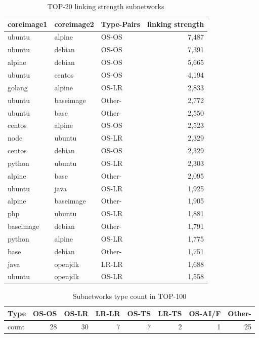\documentclass[sigconf]{acmart}
\begin{document}
\begin{table}[htbp]
  \centering
  \caption{TOP-20 linking strength subnetworks}
    \begin{tabular}{lllr}
	\toprule
    coreimage1 & coreimage2 & Type-Pairs & \multicolumn{1}{l}{linking strength} \\
	\midrule
    ubuntu & alpine & OS-OS & 7,487 \\
    ubuntu & debian & OS-OS & 7,391 \\
    alpine & debian & OS-OS & 5,665 \\
    ubuntu & centos & OS-OS & 4,194 \\
    golang & alpine & OS-LR & 2,833 \\
    ubuntu & baseimage & Other- & 2,772 \\
    ubuntu & base  & Other- & 2,550 \\
    centos & alpine & OS-OS & 2,523 \\
    node  & ubuntu & OS-LR & 2,329 \\
    centos & debian & OS-OS & 2,329 \\
    python & ubuntu & OS-LR & 2,303 \\
    alpine & base  & Other- & 2,095 \\
    ubuntu & java  & OS-LR & 1,925 \\
    alpine & baseimage & Other- & 1,905 \\
    php   & ubuntu & OS-LR & 1,881 \\
    baseimage & debian & Other- & 1,791 \\
    python & alpine & OS-LR & 1,775 \\
    base  & debian & Other- & 1,751 \\
    java  & openjdk & LR-LR & 1,688 \\
    ubuntu & openjdk & OS-LR & 1,558 \\
	\bottomrule
    \end{tabular}%
  \label{tab:addlabel}%
\end{table}%




\begin{table}[htbp]
  \centering
	\small
  \caption{Subnetworks type count in TOP-100}
    \begin{tabular}{lrrrrrrr}
\toprule
    Type & \multicolumn{1}{l}{OS-OS} & \multicolumn{1}{l}{OS-LR} & \multicolumn{1}{l}{LR-LR} & \multicolumn{1}{l}{OS-TS} & \multicolumn{1}{l}{LR-TS} & \multicolumn{1}{l}{OS-AI/F} & \multicolumn{1}{l}{Other-} \\
\midrule
    count & 28    & 30   & 7    & 7  & 2  & 1 & 25 \\
\bottomrule
    \end{tabular}%
  \label{tab:addlabel}%
\end{table}%
\end{document}
